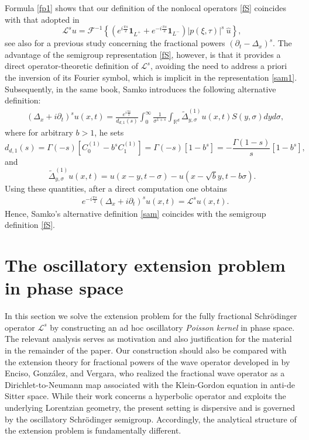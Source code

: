 \documentclass[11pt,letter]{amsart}
\def \G{\Gamma}
\newcommand{\Rd}{\mathbb R^d}
\newcommand{\p}{\partial}
\numberwithin{equation}{section}
\newcommand{\Le}{\mathcal L}
\numberwithin{equation}{section}
\begin{document}
Formula \eqref{fp1} shows that our definition of the nonlocal operators \eqref{fS} coincides with that adopted in \cite[Sec.4, p.296]{Sa}
\begin{equation}\label{sam1}
\Le^s u = \mathscr F^{-1}\left\{(e^{i\frac{\pi s}2} \mathbf 1_{L^+} + e^{-i\frac{\pi s}2} \mathbf 1_{L^-})|p(\xi,\tau)|^{s}\ \hat u\right\},
\end{equation}
see also \cite{Samp} for a previous study concerning the fractional powers $(\p_t -\Delta_x)^s$.
The advantage of the semigroup representation \eqref{fS}, however, is that it provides a direct operator-theoretic definition of $\Le^s$, avoiding the need to address a priori the inversion of its Fourier symbol, which is implicit in the representation
\eqref{sam1}. Subsequently, in the same book, Samko introduces the following alternative definition:
\begin{align}\label{sam}
& (\Delta_x + i \p_t)^s u(x,t) = \frac{e^{i\frac{\pi s }{2}}}{d_{d,1}(s)}\int_0^\infty \frac{1}{\sigma^{1+s}} \int_{\Rd} \tilde \Delta^{(1)}_{y,\sigma} u(x,t) S(y,\sigma) dy d\sigma, 
\end{align} 
where for arbitrary $b>1$, he sets 
\[
d_{d,1}(s) = \G(-s)\left[C^{(1)}_0 - b^{s} C^{(1)}_1\right] = \G(-s)\left[1 - b^{s}\right] = - \frac{\G(1-s)}s \left[1 - b^{s}\right],
\]
and 
\[
\tilde \Delta^{(1)}_{y,\sigma} u(x,t) = u(x-y,t-\sigma) - u(x-\sqrt b y,t - b \sigma).
\]
Using these quantities, after a direct  computation one  obtains
\begin{align*}
& e^{-i\frac{\pi s }{2}}(\Delta_x + i \p_t)^s u(x,t) = \Le^s u(x,t).
\end{align*} 
Hence, Samko's alternative definition \eqref{sam} coincides with the semigroup definition \eqref{fS}.


\vskip 0.2in


\section{The oscillatory extension problem in phase space}\label{S:osc}

In this section we solve the extension problem for the fully fractional Schr\"odinger operator $\Le^s$  by constructing an ad hoc oscillatory \emph{Poisson kernel} in phase space. The relevant analysis serves as motivation and also justification for the material in the remainder of the paper. Our construction should also be compared with the extension theory for fractional powers of the wave operator developed in \cite{EGV} by Enciso, Gonz\'alez, and Vergara, who realized the fractional wave operator as a Dirichlet-to-Neumann map associated with the Klein-Gordon equation in anti-de Sitter space. While their work concerns a hyperbolic operator and exploits the underlying Lorentzian geometry, the present setting is dispersive and is governed by the oscillatory Schr\"odinger semigroup. Accordingly, the analytical structure of the extension problem is fundamentally different.
\end{document}
